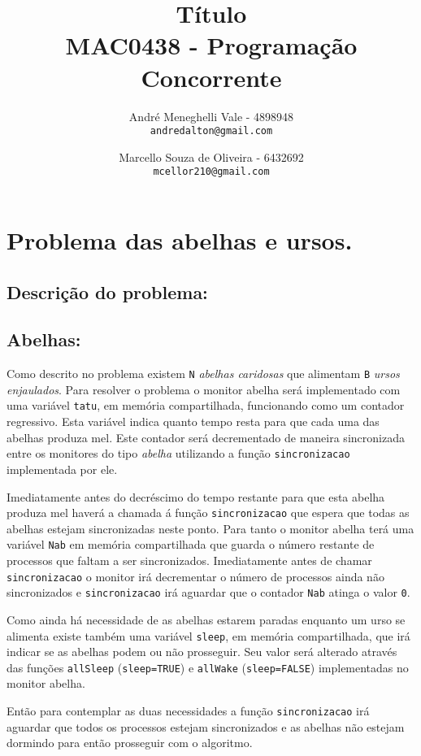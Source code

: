 \documentclass[12pt,a4paper]{article}
\title{Título\\MAC0438 - Programação Concorrente}
\author{
    André Meneghelli Vale - 4898948\\
    \texttt{andredalton@gmail.com}
    \and
    Marcello Souza de Oliveira - 6432692\\
    \texttt{mcellor210@gmail.com}
}
\date{}
\begin{document}
\maketitle

\newpage

\section{Problema das abelhas e ursos.}

\subsection{Descrição do problema:}

\subsection{Abelhas:}

Como descrito no problema existem \verb+N+ \emph{abelhas caridosas} que alimentam \verb+B+ \emph{ursos enjaulados}. Para resolver o problema o monitor abelha será implementado com uma variável \verb+tatu+, em memória compartilhada, funcionando como um contador regressivo. Esta variável indica quanto tempo resta para que cada uma das abelhas produza mel. Este contador será decrementado de maneira sincronizada entre os monitores do tipo \emph{abelha} utilizando a função \verb+sincronizacao+ implementada por ele.

Imediatamente antes do decréscimo do tempo restante para que esta abelha produza mel haverá a chamada á função \verb+sincronizacao+ que espera que todas as abelhas estejam sincronizadas neste ponto. Para tanto o monitor abelha terá uma variável \verb+Nab+ em memória compartilhada que guarda o número restante de processos que faltam a ser sincronizados. Imediatamente antes de chamar \verb+sincronizacao+ o monitor irá decrementar o número de processos ainda não sincronizados e \verb+sincronizacao+ irá aguardar que o contador \verb+Nab+ atinga o valor \verb+0+.

Como ainda há necessidade de as abelhas estarem paradas enquanto um urso se alimenta existe também uma variável \verb+sleep+, em memória compartilhada, que irá indicar se as abelhas podem ou não prosseguir. Seu valor será alterado através das funções \verb+allSleep+ (\verb+sleep=TRUE+) e \verb+allWake+ (\verb+sleep=FALSE+) implementadas no monitor abelha.

Então para contemplar as duas necessidades a função \verb+sincronizacao+ irá aguardar que todos os processos estejam sincronizados e as abelhas não estejam dormindo para então prosseguir com o algoritmo.
\end{document}
